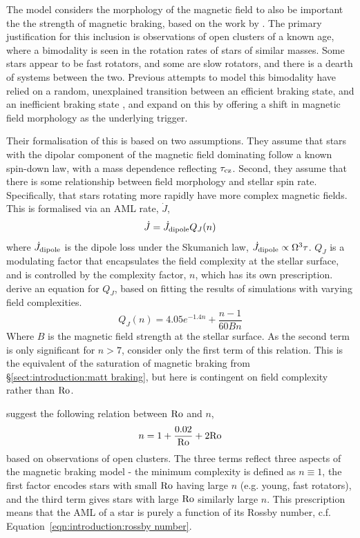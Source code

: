 The \citet{garraffo2018a} model considers the morphology of the magnetic field to also be important the the strength of magnetic braking, based on the work by \citet{garraffo2015}. The primary justification for this inclusion is observations of open clusters of a known age, where a bimodality is seen in the rotation rates of stars of similar masses. Some stars appear to be fast rotators, and some are slow rotators, and there is a dearth of systems between the two. 
Previous attempts to model this bimodality have relied on a random, unexplained transition between an efficient braking state, and an inefficient braking state \citep{spada2011,reiners2012, gallet2013}, and \citet{garraffo2018a} expand on this by offering a shift in magnetic field morphology as the underlying trigger.

Their formalisation of this is based on two assumptions. They assume that stars with the dipolar component of the magnetic field dominating  follow a known spin-down law, with a mass dependence reflecting $\tau_{\rm cz}$. Second, they assume that there is some relationship between field morphology and stellar spin rate. Specifically, that stars rotating more rapidly have more complex magnetic fields. This is formalised via an AML rate, $\dot J$,
\begin{equation}
    \dot J = \dot J_{\rm dipole}Q_J(n)
\end{equation}
where $\dot J_{\rm dipole}$ is the dipole loss under the Skumanich law, $\dot J_{\rm dipole} \propto \Omega^3 \tau$. $Q_J$ is a modulating factor that encapsulates the field complexity at the stellar surface, and is controlled by the complexity factor, $n$, which has its own prescription. \citet{garraffo2016} derive an equation for $Q_J$, based on fitting the results of simulations with varying field complexities.
\begin{equation}
    Q_J(n) = 4.05 e^{-1.4n} + \frac{n-1}{60Bn}
\end{equation}
Where $B$ is the magnetic field strength at the stellar surface. As the second term is only significant for $n > 7$, \citet{garraffo2018a} consider only the first term of this relation. This is the equivalent of the saturation of magnetic braking from \S\ref{sect:introduction:matt braking}, but here is contingent on field complexity rather than $\rm Ro$. 

\citet{garraffo2018a} suggest the following relation between $\rm Ro$ and $n$,
\begin{equation}
    n = 1 + \frac{0.02}{\rm Ro} + 2 {\rm Ro}
\end{equation}
based on observations of open clusters. The three terms reflect three aspects of the magnetic braking model - the minimum complexity is defined as $n \equiv 1$, the first factor encodes stars with small $\rm Ro$ having large $n$ (e.g. young, fast rotators), and the third term gives stars with large $\rm Ro$ similarly large $n$. 
This prescription means that the AML of a star is purely a function of its Rossby number, c.f. Equation~\ref{eqn:introduction:rossby number}.

